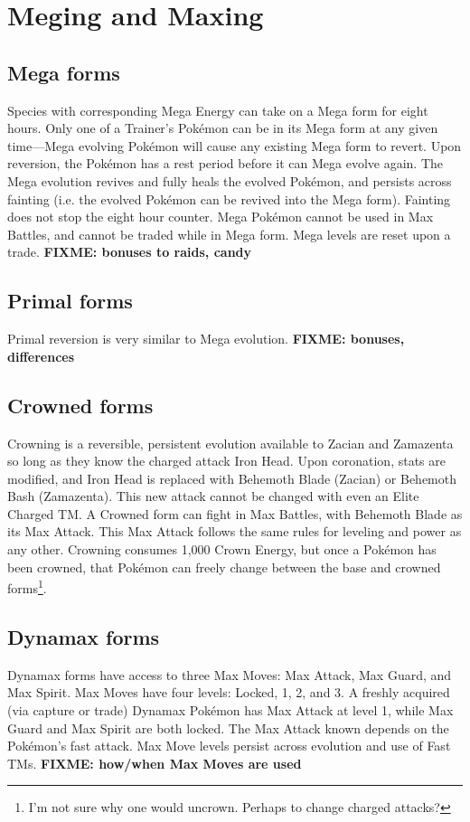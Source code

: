 \chapter{Meging and Maxing}
\label{chap:megmax}

\section{Mega forms}
\label{sec:mega}
Species with corresponding Mega Energy can take on a Mega form for eight hours.
Only one of a Trainer's Pokémon can be in its Mega form at any given time---Mega
  evolving Pokémon will cause any existing Mega form to revert.
Upon reversion, the Pokémon has a rest period before it can Mega evolve again.
The Mega evolution revives and fully heals the evolved Pokémon, and persists across
  fainting (i.e. the evolved Pokémon can be revived into the Mega form).
Fainting does not stop the eight hour counter.
Mega Pokémon cannot be used in Max Battles, and cannot be traded while in Mega form.
Mega levels are reset upon a trade.
\textbf{FIXME: bonuses to raids, candy}


\section{Primal forms}
\label{sec:primal}
Primal reversion is very similar to Mega evolution.
\textbf{FIXME: bonuses, differences}


\section{Crowned forms}
\label{sec:crowned}
Crowning is a reversible, persistent evolution available to Zacian and Zamazenta
 so long as they know the charged attack Iron Head.
Upon coronation, stats are modified, and Iron Head is replaced with Behemoth Blade (Zacian)
  or Behemoth Bash (Zamazenta).
This new attack cannot be changed with even an Elite Charged TM\@.
A Crowned form can fight in Max Battles, with Behemoth Blade as its Max Attack.
This Max Attack follows the same rules for leveling and power as any other.
Crowning consumes 1,000 Crown Energy, but once a Pokémon has been crowned,
  that Pokémon can freely change between the base and crowned
  forms\footnote{I'm not sure why one would uncrown. Perhaps to change charged attacks?}.


\section{Dynamax forms}
\label{sec:dmax}
Dynamax forms have access to three Max Moves: Max Attack, Max Guard, and Max Spirit.
Max Moves have four levels: Locked, 1, 2, and 3.
A freshly acquired (via capture or trade) Dynamax Pokémon has Max Attack at level 1,
  while Max Guard and Max Spirit are both locked.
The Max Attack known depends on the Pokémon's fast attack.
Max Move levels persist across evolution and use of Fast TMs.
\textbf{FIXME: how/when Max Moves are used}


